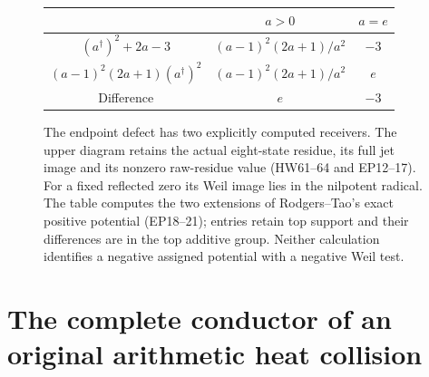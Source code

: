 \documentclass[11pt,a4paper]{article}
\theoremstyle{definition}\newtheorem{definition}[theorem]{Definition}
\begin{document}
\begin{figure}[p]
\centering
{}
\medskip
\begin{tabular}{c|c|c}
 & $a>0$ & $a=e$\\\hline
 $(a^\dagger)^2+2a-3$ & $(a-1)^2(2a+1)/a^2$ & $-3$\\[3pt]
 $(a-1)^2(2a+1)(a^\dagger)^2$ & $(a-1)^2(2a+1)/a^2$ & $e$\\[3pt]
 Difference & $e$ & $-3$
\end{tabular}
\caption{The endpoint defect has two explicitly computed receivers.
The upper diagram retains the actual eight-state residue, its full
jet image and its nonzero raw-residue value (HW61--64 and EP12--17).
For a fixed reflected zero its Weil image lies in the nilpotent radical.
The table computes the two extensions of Rodgers--Tao's exact
positive potential (EP18--21); entries retain top support and their
differences are in the top additive group. Neither calculation
identifies a negative assigned potential with a negative Weil test.}
\end{figure}




\clearpage
\section{The complete conductor of an original arithmetic heat collision}
\label{sec:hc}
\newcommand{\HC}{\refstepcounter{hc}\par\medskip\noindent\textbf{\thehc.}\ }
\end{document}
